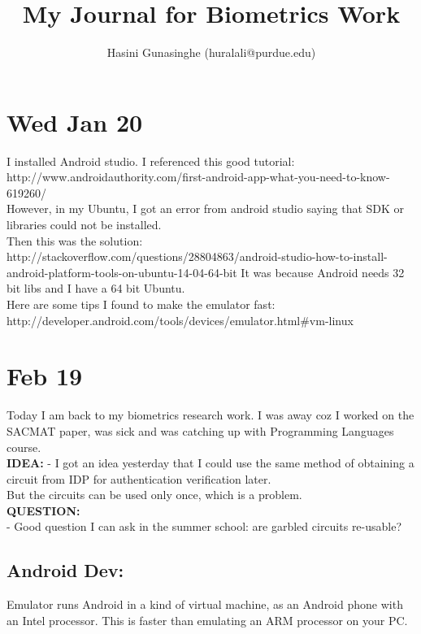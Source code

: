 \documentclass[11pt]{article}
\title{
\vspace{-20.mm}
My Journal for Biometrics Work}
\author{Hasini Gunasinghe (huralali@purdue.edu)}
\date{}
\begin{document}
\maketitle

\section*{Wed Jan 20}
I installed Android studio. I referenced this good tutorial: http://www.androidauthority.com/first-android-app-what-you-need-to-know-619260/\\
However, in my Ubuntu, I got an error from android studio saying that SDK or libraries could not be installed. \\
Then this was the solution: http://stackoverflow.com/questions/28804863/android-studio-how-to-install-android-platform-tools-on-ubuntu-14-04-64-bit
It was because Android needs 32 bit libs and I have a 64 bit Ubuntu.\\
Here are some tips I found to make the emulator fast:
http://developer.android.com/tools/devices/emulator.html\#vm-linux

\section*{Feb 19}
Today I am back to my biometrics research work. I was away coz I worked on the SACMAT paper, was sick and was catching up with Programming
Languages course.\\

\textbf{IDEA:}
- I got an idea yesterday that I could use the same method of obtaining a circuit from IDP for authentication verification later.\\ 
But the circuits can be used only once, which is a problem.\\
\textbf{QUESTION:}\\
- Good question I can ask in the summer school: are garbled circuits re-usable?

\subsection*{Android Dev:}
Emulator runs Android in a kind of virtual machine, as an Android phone with an Intel processor. This is faster than emulating an ARM processor on 
your PC.
\end{document}
